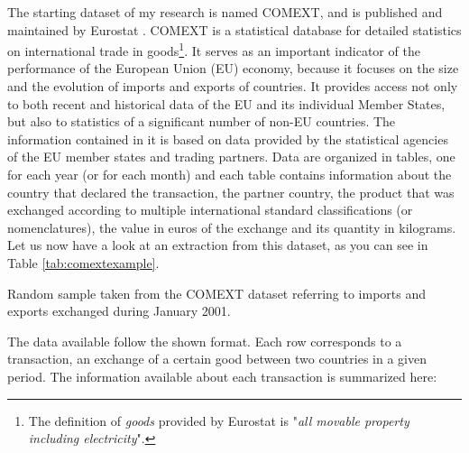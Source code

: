 The starting dataset of my research is named COMEXT, and is published and maintained by Eurostat \cite{eurostat2022comext}. COMEXT is a statistical database for detailed statistics on international trade in goods\footnote{The definition of \textit{goods} provided by Eurostat is "\textit{all movable property including electricity}".}. It serves as an important indicator of the performance of the European Union (EU) economy, because it focuses on the size and the evolution of imports and exports of countries. It provides access not only to both recent and historical data of the EU and its individual Member States, but also to statistics of a significant number of non-EU countries. The information contained in it is based on data provided by the statistical agencies of the EU member states and trading partners.
Data are organized in tables, one for each year (or for each month) and each table contains information about the country that declared the transaction, the partner country, the product that was exchanged according to multiple international standard classifications (or nomenclatures), the value in euros of the exchange and its quantity in kilograms.
Let us now have a look at an extraction from this dataset, as you can see in Table \ref{tab:comextexample}.
\begin{landscape}
\begin{table}
    \centering
    
    \caption{Random sample taken from the COMEXT dataset referring to imports and exports exchanged during January 2001.}
    \label{tab:comextexample}
\end{table}
\end{landscape}
The data available follow the shown format. Each row corresponds to a transaction, an exchange of a certain good between two countries in a given period. The information available about each transaction is summarized here:%
